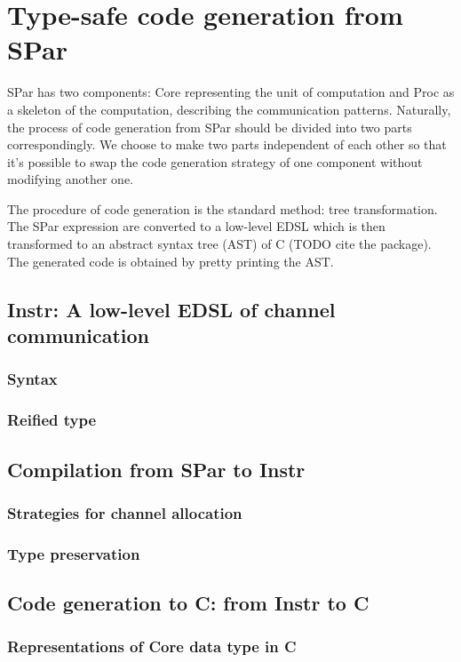 \chapter{Type-safe code generation from SPar}
SPar has two components: Core representing the unit of computation and Proc as a skeleton of the computation, describing the communication patterns. Naturally, the process of code generation from SPar should be divided into two parts correspondingly. We choose to make two parts independent of each other so that it's possible to swap the code generation strategy of one component without modifying another one.

The procedure of code generation is the standard method: tree transformation. The SPar expression are converted to a low-level EDSL which is then transformed to an abstract syntax tree (AST) of C (TODO cite the package). The generated code is obtained by pretty printing the AST.
\section{Instr: A low-level EDSL of channel communication}
\subsection{Syntax}
\subsection{Reified type}
\section{Compilation from SPar to Instr}
\subsection{Strategies for channel allocation}
\subsection{Type preservation}
\section{Code generation to C: from Instr to C}
\subsection{Representations of Core data type in C}
